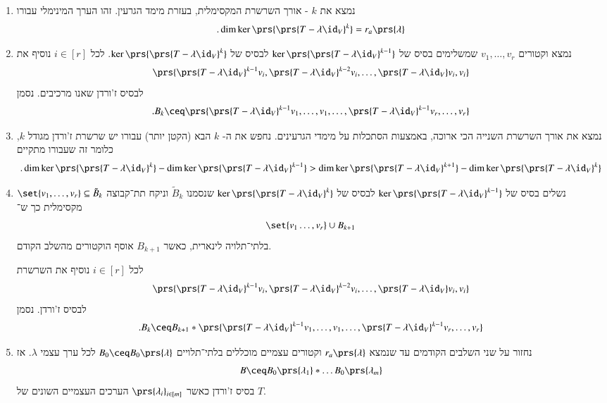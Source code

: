 \documentclass[a4paper,10pt,oneside,openany]{article}
\newcommand{\heart}{\ensuremath\varheartsuit}
\begin{document}
\begin{enumerate}
\item נמצא את
$k$%
- אורך השרשרת המקסימלית, בעזרת מימד הגרעין.
זהו הערך המינימלי עבורו
\[\text{.} \dim \ker \prs{\prs{T-\lambda \id_V}^k} = r_a\prs{\lambda}\]

\item נמצא וקטורים
$v_1, \ldots, v_r$
שמשלימים בסיס של
$\ker\prs{\prs{T-\lambda \id_V}^{k-1}}$
לבסיס של
$\ker\prs{\prs{T-\lambda \id_V}^k}$.
לכל
$i \in [r]$
נוסיף את
\[\prs{\prs{T-\lambda \id_V}^{k-1} v_i, \prs{T-\lambda \id_V}^{k-2} v_i, \ldots, \prs{T-\lambda\id_V} v_i, v_i}\]
לבסיס ז'ורדן שאנו מרכיבים.
נסמן
\begin{align*}
\text{.} B_k \ceq \prs{\prs{T-\lambda \id_V}^{k-1} v_1, \ldots, v_1, \ldots, \prs{T-\lambda \id_V}^{k-1} v_r, \ldots, v_r}
\end{align*}


\item נמצא את אורך השרשרת השנייה הכי ארוכה, באמצעות הסתכלות על מימדי הגרעינים.
נחפש את ה-%
$k$
הבא (הקטן יותר) עבורו יש שרשרת ז'ורדן מגודל
$k$,
כלומר זה שעבורו מתקיים
\[\text{.} \dim \ker\prs{\prs{T-\lambda \id_V}^k} - \dim \ker\prs{\prs{T - \lambda \id_V}^{k - 1}} > \dim \ker\prs{\prs{T-\lambda \id_V}^{k+1}} - \dim \ker\prs{\prs{T - \lambda \id_V}^{k}}\]

\item נשלים בסיס של
$\ker\prs{\prs{T-\lambda \id_V}^{k-1}}$
לבסיס של
$\ker\prs{\prs{T-\lambda \id_V}^k}$
שנסמנו
$\tilde{B}_k$
וניקח תת־קבוצה
$\set{v_1, \ldots, v_r} \subseteq \tilde{B}_k$
מקסימלית כך ש־%
\[\set{v_1 \ldots, v_r} \cup B_{k+1}\]
בלתי־תלויה לינארית,
כאשר
$B_{k+1}$
אוסף הוקטורים מהשלב הקודם.

לכל
$i \in [r]$
נוסיף את השרשרת
\[\prs{\prs{T-\lambda \id_V}^{k-1} v_i, \prs{T-\lambda \id_V}^{k-2} v_i, \ldots, \prs{T-\lambda\id_V} v_i, v_i}\]
לבסיס ז'ורדן. נסמן
\[\text{.} B_k \ceq B_{k+1} * \prs{\prs{T-\lambda \id_V}^{k-1} v_1, \ldots, v_1, \ldots, \prs{T-\lambda \id_V}^{k-1} v_r, \ldots, v_r}\]

\item נחזור על שני השלבים הקודמים עד שנמצא
$r_a\prs{\lambda}$
וקטורים עצמיים מוכללים בלתי־תלויים
$B_0 \ceq B_0\prs{\lambda}$
לכל ערך עצמי
$\lambda$.
אז
\[B \ceq B_0\prs{\lambda_1} * \ldots B_0\prs{\lambda_m}\]
בסיס ז'ורדן כאשר
$\prs{\lambda_i}_{i \in [m]}$
הערכים העצמיים השונים של
$T$.
\end{enumerate}
\end{document}
